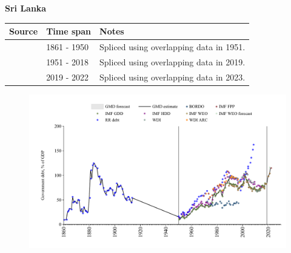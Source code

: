 \documentclass[12pt,a4paper,landscape]{article}
\begin{document}
\begin{adjustbox}{max totalsize={\paperwidth}{\paperheight},center}
\begin{minipage}[t][\textheight][t]{\textwidth}
\vspace*{0.5cm}
{}
\begin{center}
{\Large\bfseries Sri Lanka}
\end{center}
\vspace{0.5cm}
\begin{table}[H]
\centering
\small
\begin{tabular}{|l|l|l|}
\hline
\textbf{Source} & \textbf{Time span} & \textbf{Notes} \\
\hline
\rowcolor{white}\cite{RR_debt}& 1861 - 1950 &Spliced using overlapping data in 1951.\\
\rowcolor{lightgray}\cite{IMF_GDD}& 1951 - 2018 &Spliced using overlapping data in 2019.\\
\rowcolor{white}\cite{IMF_FPP}& 2019 - 2022 &Spliced using overlapping data in 2023.\\
\hline
\end{tabular}
\end{table}
\begin{figure}[H]
\centering
\includegraphics[width=\textwidth,height=0.6\textheight,keepaspectratio]{graphs/LKA_govdebt_GDP.pdf}
\end{figure}
\end{minipage}
\end{adjustbox}
\end{document}
